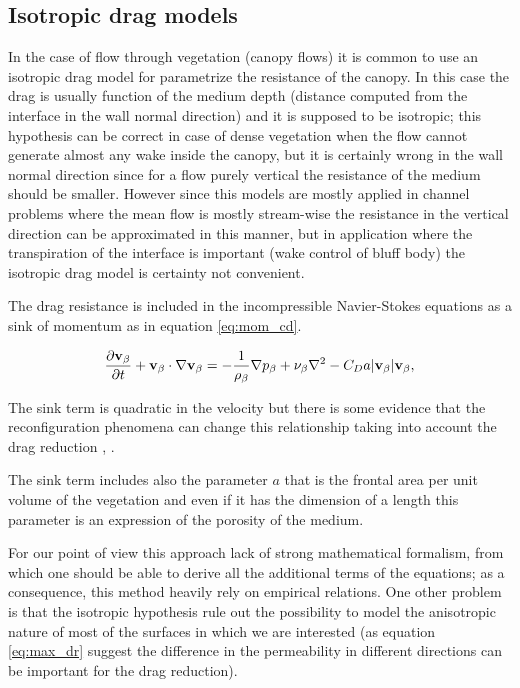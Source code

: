 \subsection{Isotropic drag models}
\label{sec:canopy_eq}

In the case of flow through vegetation (canopy flows) it is common to use an isotropic drag model for parametrize the resistance of the canopy.
In this case the drag is usually function of the medium depth (distance computed from the interface in the wall normal direction) and it is supposed to be isotropic; this hypothesis can be correct in case of dense vegetation when the flow cannot generate almost any wake inside the canopy, but it is certainly wrong in the wall normal direction since for a flow purely vertical the resistance of the medium should be smaller.
However since this models are mostly applied in channel problems where the mean flow is mostly stream-wise the resistance in the vertical direction can be approximated in this manner, but in application where the transpiration of the interface is important (wake control of bluff body) the isotropic drag model is certainty not convenient.

The drag resistance is included in the incompressible Navier-Stokes equations as a sink of momentum as in equation \ref{eq:mom_cd}.

\begin{equation}
\frac{\partial \textbf{v}_{\beta}}{\partial t} + \textbf{v}_{\beta} \cdot \nabla \textbf{v}_{\beta} = -\frac{1}{\rho_{\beta}} \nabla p_{\beta} + \nu_{\beta} \nabla^2 -C_D a |\textbf{v}_{\beta}| \textbf{v}_{\beta}, 
\label{eq:mom_cd}
\end{equation}

The sink term is quadratic in the velocity but there is some evidence that the reconfiguration phenomena can change this relationship taking into account the drag reduction \citet{gosselin2011drag}, \citet{alvarado2017nature}.

The sink term includes also the parameter $a$ that is the frontal area per unit volume of the vegetation and even if it has the dimension of a length this parameter is an expression of the porosity of the medium.

For our point of view this approach lack of strong mathematical formalism, from which one should be able to derive all the additional terms of the equations; as a consequence, this method heavily rely on empirical relations.
One other problem is that the isotropic hypothesis rule out the possibility to model the anisotropic nature of most of the surfaces in which we are interested (as equation \ref{eq:max_dr} suggest the difference in the permeability in different directions can be important for the drag reduction).

